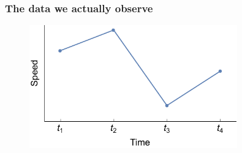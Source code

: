 \documentclass{beamer}
\begin{document}
\begin{frame}
\frametitle{The data we actually observe}

\begin{figure}
    \centering
    \includegraphics[width=0.8\textwidth]{figures/hmm_time_series.pdf}
\end{figure}
    
\end{frame}
\end{document}

